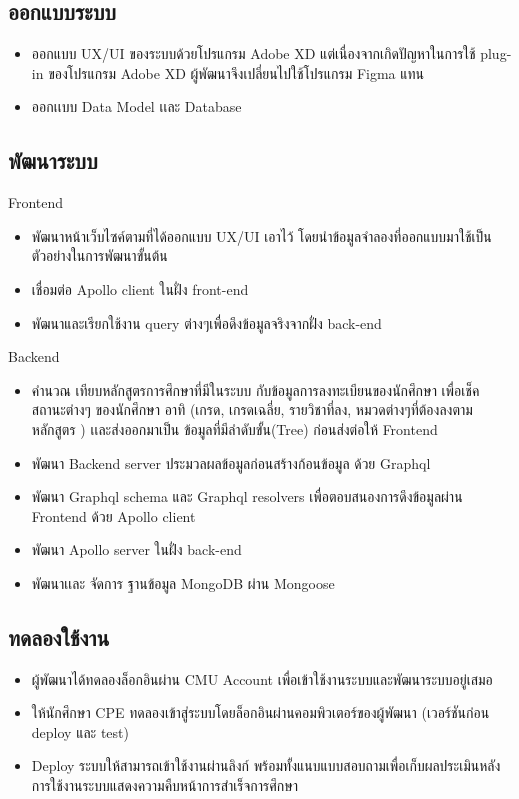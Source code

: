 \subsection{ออกแบบระบบ}
\begin{itemize}
  \item ออกแบบ UX/UI ของระบบด้วยโปรแกรม Adobe XD แต่เนื่องจากเกิดปัญหาในการใช้ plug-in ของโปรแกรม Adobe XD ผู้พัฒนาจึงเปลี่ยนไปใช้โปรแกรม 
  Figma แทน
  \item ออกเเบบ Data Model เเละ Database
\end{itemize}

\subsection{พัฒนาระบบ}

Frontend
\begin{itemize}
  \item พัฒนาหน้าเว็บไซค์ตามที่ได้ออกแบบ UX/UI เอาไว้ โดยนำข้อมูลจำลองที่ออกแบบมาใช้เป็นตัวอย่างในการพัฒนาขั้นต้น
  \item เชื่อมต่อ Apollo client ในฝั่ง front-end
  \item พัฒนาและเรียกใช้งาน query ต่างๆเพื่อดึงข้อมูลจริงจากฝั่ง back-end
\end{itemize}
Backend
\begin{itemize}
  \item คํานวณ เทียบหลักสูตรการศึกษาที่มีในระบบ กับข้อมูลการลงทะเบียนของนักศึกษา เพื่อเช็คสถานะต่างๆ 
  ของนักศึกษา อาทิ (เกรด, เกรดเฉลี่ย, รายวิชาที่ลง, หมวดต่างๆที่ต้องลงตามหลักสูตร ) เเละส่งออกมาเป็น ข้อมูลที่มีลําดับขั้น(Tree) ก่อนส่งต่อให้ Frontend
  \item พัฒนา Backend server ประมวลผลข้อมูลก่อนสร้างก้อนข้อมูล ด้วย Graphql 
  \item พัฒนา Graphql schema และ Graphql resolvers เพื่อตอบสนองการดึงข้อมูลผ่าน Frontend ด้วย Apollo client
  \item พัฒนา Apollo server ในฝั่ง back-end
  \item พัฒนาเเละ จัดการ ฐานข้อมูล MongoDB ผ่าน Mongoose
\end{itemize}

\subsection{ทดลองใช้งาน}
\begin{itemize}
  \item ผู้พัฒนาได้ทดลองล็อกอินผ่าน CMU Account เพื่อเข้าใช้งานระบบและพัฒนาระบบอยู่เสมอ
  \item ให้นักศึกษา CPE ทดลองเข้าสู่ระบบโดยล็อกอินผ่านคอมพิวเตอร์ของผู้พัฒนา (เวอร์ชันก่อน deploy และ test)
  \item Deploy ระบบให้สามารถเข้าใช้งานผ่านลิงก์ พร้อมทั้งแนบแบบสอบถามเพื่อเก็บผลประเมินหลังการใช้งานระบบแสดงความคืบหน้าการสำเร็จการศึกษา
\end{itemize}

